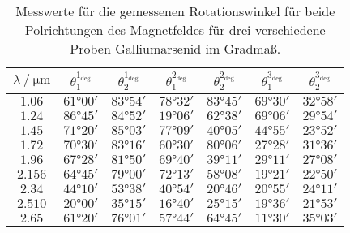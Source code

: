 \begin{table}[H]
    \centering
    \caption{Messwerte für die gemessenen Rotationswinkel für beide Polrichtungen des Magnetfeldes für drei verschiedene Proben Galliumarsenid im Gradmaß.}
    \label{tab:Winkeldaten}
    \begin{tabular}{S[table-format=1.3] | c c |c c | c c}
    \toprule
      {$\lambda \mathbin{/} \unit{\micro\meter}$ } & {$\theta^{1_\text{deg}}_1$} & {$\theta^{1_\text{deg}}_2$} & {$\theta^{2_\text{deg}}_1$} & {$\theta^{2_\text{deg}}_2$} & {$\theta^{3_\text{deg}}_1$} & {$\theta^{3_\text{deg}}_2$} \\
    \midrule
    {$1.06$}    & {$61°00'$}&   {$83°54'$}&   {$78°32'$}&   {$83°45'$}&   {$69°30'$}&  {$32°58'$} \\
    {$1.24$}    & {$86°45'$}&   {$84°52'$}&   {$19°06'$}&   {$62°38'$}&   {$69°06'$}&  {$29°54'$} \\
    {$1.45$}    & {$71°20'$}&   {$85°03'$}&   {$77°09'$}&   {$40°05'$}&   {$44°55'$}&  {$23°52'$} \\
    {$1.72$}    & {$70°30'$}&   {$83°16'$}&   {$60°30'$}&   {$80°06'$}&   {$27°28'$}&  {$31°36'$} \\
    {$1.96$}    & {$67°28'$}&   {$81°50'$}&   {$69°40'$}&   {$39°11'$}&   {$29°11'$}&  {$27°08'$} \\
    {$2.156$}   & {$64°45'$}&   {$79°00'$}&   {$72°13'$}&   {$58°08'$}&   {$19°21'$}&  {$22°50'$} \\
    {$2.34$}    & {$44°10'$}&   {$53°38'$}&   {$40°54'$}&   {$20°46'$}&   {$20°55'$}&  {$24°11'$} \\
    {$2.510$}   & {$20°00'$}&   {$35°15'$}&   {$16°40'$}&   {$25°15'$}&   {$19°36'$}&  {$21°53'$} \\
    {$2.65$}    & {$61°20'$}&   {$76°01'$}&   {$57°44'$}&   {$64°45'$}&   {$11°30'$}&  {$35°03'$} \\
    \bottomrule
    \end{tabular}
\end{table}


